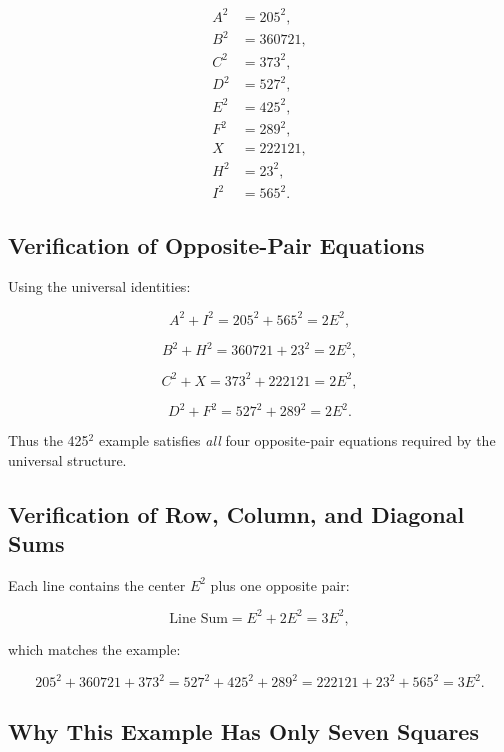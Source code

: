 \documentclass[12pt]{article}
\begin{document}
\[
\begin{aligned}
A^2 &= 205^2, \\
B^2 &= 360721, \\
C^2 &= 373^2, \\
D^2 &= 527^2, \\
E^2 &= 425^2, \\
F^2 &= 289^2, \\
X   &= 222121, \\
H^2 &= 23^2, \\
I^2 &= 565^2.
\end{aligned}
\]



\subsection*{Verification of Opposite-Pair Equations}

Using the universal identities:



\[
A^2 + I^2 = 205^2 + 565^2 = 2E^2,
\]




\[
B^2 + H^2 = 360721 + 23^2 = 2E^2,
\]




\[
C^2 + X = 373^2 + 222121 = 2E^2,
\]




\[
D^2 + F^2 = 527^2 + 289^2 = 2E^2.
\]



Thus the 425$^2$ example satisfies \emph{all} four opposite-pair equations required by the universal structure.

\subsection*{Verification of Row, Column, and Diagonal Sums}

Each line contains the center $E^2$ plus one opposite pair:


\[
\text{Line Sum} = E^2 + 2E^2 = 3E^2,
\]


which matches the example:


\[
205^2 + 360721 + 373^2
= 527^2 + 425^2 + 289^2
= 222121 + 23^2 + 565^2
= 3E^2.
\]



\subsection*{Why This Example Has Only Seven Squares}
\end{document}
